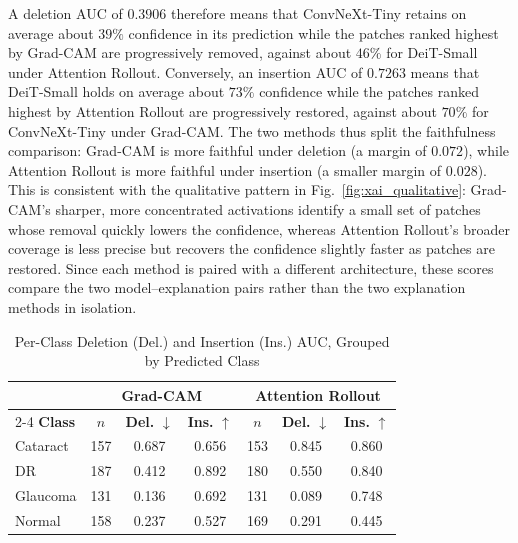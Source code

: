 A deletion AUC of $0.3906$ therefore means that ConvNeXt-Tiny retains on average about $39\%$ confidence in its prediction while the patches ranked highest by Grad-CAM are progressively removed, against about $46\%$ for DeiT-Small under Attention Rollout.
Conversely, an insertion AUC of $0.7263$ means that DeiT-Small holds on average about $73\%$ confidence while the patches ranked highest by Attention Rollout are progressively restored, against about $70\%$ for ConvNeXt-Tiny under Grad-CAM.
The two methods thus split the faithfulness comparison: Grad-CAM is more faithful under deletion (a margin of $0.072$), while Attention Rollout is more faithful under insertion (a smaller margin of $0.028$).
This is consistent with the qualitative pattern in Fig.~\ref{fig:xai_qualitative}: Grad-CAM's sharper, more concentrated activations identify a small set of patches whose removal quickly lowers the confidence, whereas Attention Rollout's broader coverage is less precise but recovers the confidence slightly faster as patches are restored.
Since each method is paired with a different architecture, these scores compare the two model--explanation pairs rather than the two explanation methods in isolation.

\begin{table}[htbp]
\caption{Per-Class Deletion (Del.) and Insertion (Ins.) AUC, Grouped by Predicted Class}
\label{tab:faithfulness_per_class}
\centering
\begin{tabular*}{\columnwidth}{@{\extracolsep{\fill}}lcccccc@{}}
\toprule
 & \multicolumn{3}{c}{\textbf{Grad-CAM}} & \multicolumn{3}{c}{\textbf{Attention Rollout}} \\
\cmidrule{2-4} \cmidrule{5-7}
\textbf{Class} & $n$ & \textbf{Del.} $\downarrow$ & \textbf{Ins.} $\uparrow$ & $n$ & \textbf{Del.} $\downarrow$ & \textbf{Ins.} $\uparrow$ \\
\midrule
Cataract & 157 & 0.687 & 0.656 & 153 & 0.845 & 0.860 \\
DR & 187 & 0.412 & 0.892 & 180 & 0.550 & 0.840 \\
Glaucoma & 131 & 0.136 & 0.692 & 131 & 0.089 & 0.748 \\
Normal & 158 & 0.237 & 0.527 & 169 & 0.291 & 0.445 \\
\bottomrule
\end{tabular*}
\end{table}


